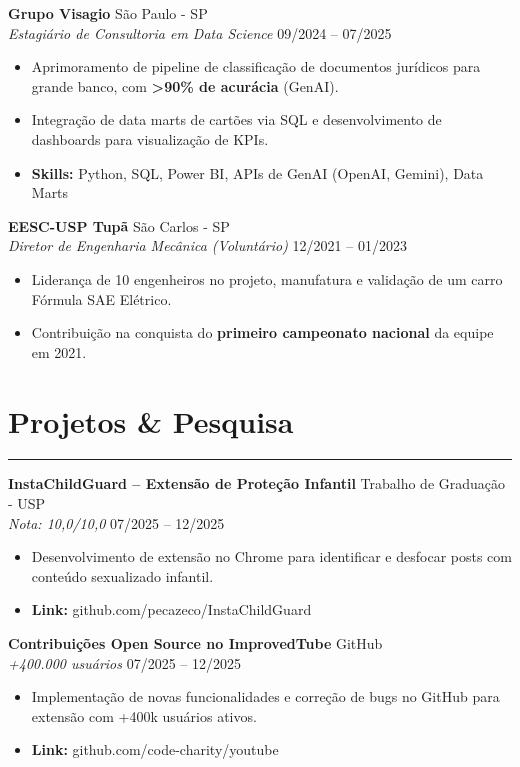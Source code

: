 \documentclass[10pt,a4paper]{article}
\begin{document}
\textbf{Grupo Visagio} \hfill São Paulo - SP \\
\textit{Estagiário de Consultoria em Data Science} \hfill 09/2024 -- 07/2025
\begin{itemize}[nosep]
    \item Aprimoramento de pipeline de classificação de documentos jurídicos para grande banco, com \textbf{>90\% de acurácia} (GenAI).
    \item Integração de data marts de cartões via SQL e desenvolvimento de dashboards para visualização de KPIs.
    \item \textbf{Skills:} Python, SQL, Power BI, APIs de GenAI (OpenAI, Gemini), Data Marts
\end{itemize}

\textbf{EESC-USP Tupã} \hfill São Carlos - SP \\
\textit{Diretor de Engenharia Mecânica (Voluntário)} \hfill 12/2021 -- 01/2023
\begin{itemize}[nosep]
    \item Liderança de 10 engenheiros no projeto, manufatura e validação de um carro Fórmula SAE Elétrico.
    \item Contribuição na conquista do \textbf{primeiro campeonato nacional} da equipe em 2021.
\end{itemize}

\section*{Projetos \& Pesquisa}
\hrule \vspace{2mm}
\textbf{InstaChildGuard -- Extensão de Proteção Infantil} \hfill Trabalho de Graduação - USP \\
\textit{Nota: 10,0/10,0} \hfill 07/2025 -- 12/2025
\begin{itemize}[nosep]
    \item Desenvolvimento de extensão no Chrome para identificar e desfocar posts com conteúdo sexualizado infantil.
    \item \textbf{Link:} github.com/pecazeco/InstaChildGuard
\end{itemize}

\textbf{Contribuições Open Source no ImprovedTube} \hfill GitHub \\
\textit{+400.000 usuários} \hfill 07/2025 -- 12/2025
\begin{itemize}[nosep]
    \item Implementação de novas funcionalidades e correção de bugs no GitHub para extensão com +400k usuários ativos.
    \item \textbf{Link:} github.com/code-charity/youtube
\end{itemize}
\end{document}
